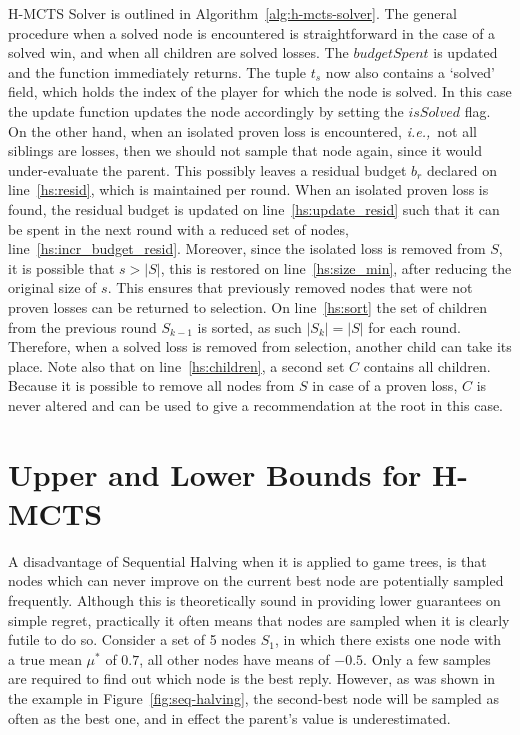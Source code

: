 \documentclass{kecsmstr}
\newcommand{\ie}{{\it i.e.,}~}
\newcommand{\func}[1]{{\sc #1}}
\begin{document}
\DecMargin{1em}
\newpage
H-MCTS Solver is outlined in Algorithm~\ref{alg:h-mcts-solver}. The general procedure when a solved node is encountered is straightforward in the case of a solved win, and when all children are solved losses. The $budgetSpent$ is updated and the function immediately returns. The tuple $t_s$ now also contains a `solved' field, which holds the index of the player for which the node is solved. In this case the \func{update} function updates the node accordingly by setting the $isSolved$ flag. On the other hand, when an isolated proven loss is encountered, \ie not all siblings are losses, then we should not sample that node again, since it would under-evaluate the parent. This possibly leaves a residual budget $b_r$ declared on line~\ref{hs:resid}, which is maintained per round. When an isolated proven loss is found, the residual budget is updated on line~\ref{hs:update_resid} such that it can be spent in the next round with a reduced set of nodes, line~\ref{hs:incr_budget_resid}. Moreover, since the isolated loss is removed from $S$, it is possible that $s > |S|$, this is restored on line~\ref{hs:size_min}, after reducing the original size of $s$. This ensures that previously removed nodes that were not proven losses can be returned to selection. On line~\ref{hs:sort} the set of children from the previous round $S_{k-1}$ is sorted, as such $|S_k| = |S|$ for each round. Therefore, when a solved loss is removed from selection, another child can take its place. Note also that on line~\ref{hs:children}, a second set $C$ contains all children. Because it is possible to remove all nodes from $S$ in case of a proven loss, $C$ is never altered and can be used to give a recommendation at the root in this case.
\newpage
\section{Upper and Lower Bounds for H-MCTS}
\label{sec:ulb_h-mcts}
A disadvantage of Sequential Halving when it is applied to game trees, is that nodes which can never improve on the current best node are potentially sampled frequently. Although this is theoretically sound in providing lower guarantees on simple regret, practically it often means that nodes are sampled when it is clearly futile to do so. Consider a set of 5 nodes $S_1$, in which there exists one node with a true mean $\mu^*$ of $0.7$, all other nodes have means of $-0.5$. Only a few samples are required to find out which node is the best reply. However, as was shown in the example in Figure~\ref{fig:seq-halving}, the second-best node will be sampled as often as the best one, and in effect the parent's value is underestimated. 
\end{document}
